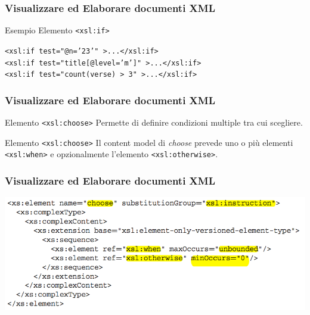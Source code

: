 \begin{frame}
    \frametitle{Visualizzare ed Elaborare documenti XML}
    \addtocounter{nframe}{1}
    

     \begin{block}{Esempio Elemento \texttt{<xsl:if>}}
        
        \texttt{<xsl:if test="@n='23'" >...</xsl:if>}
        \\\texttt{<xsl:if test="title[@level='m']" >...</xsl:if>}
        \\\texttt{<xsl:if test="count(verse) > 3" >...</xsl:if>}
        \\\texttt{}

     \end{block}

\end{frame}


\begin{frame}
    \frametitle{Visualizzare ed Elaborare documenti XML}
    \addtocounter{nframe}{1}
    

     \begin{block}{Elemento \texttt{<xsl:choose>}}
        Permette di definire condizioni multiple tra cui scegliere.
     \end{block}

     \begin{block}{Elemento \texttt{<xsl:choose>}}
        Il content model di \textit{choose} prevede uno o più elementi \texttt{<xsl:when>} e opzionalmente l'elemento \texttt{<xsl:otherwise>}.
     \end{block}

\end{frame}

\begin{frame}
    \frametitle{Visualizzare ed Elaborare documenti XML}
    \addtocounter{nframe}{1}
    
    \begin{center}
        \includegraphics[width=.95\textwidth]{imgs/Schema-choose.png}
    \end{center}

\end{frame}

